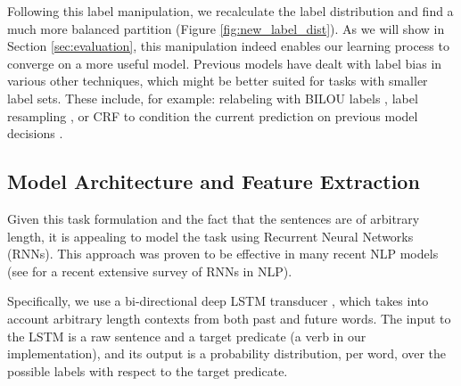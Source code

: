\begin{figure}[H]
\end{figure}


Following this label manipulation, we recalculate the label distribution and find
a much more balanced partition (Figure \ref{fig:new_label_dist}).
As we will show in Section \ref{sec:evaluation}, this manipulation indeed enables our learning process to
converge on a more useful model.
Previous models have dealt with label bias in various other techniques, which might be better suited
for tasks with smaller label sets. These include, for example:
relabeling with BILOU labels \cite{ratinov2009design},
label resampling \cite{estabrooks2004multiple},
or CRF to condition the current prediction on previous model decisions \cite{baidusrl}.

\subsection{Model Architecture and Feature Extraction}
Given this task formulation and the fact that the sentences are of arbitrary length,
it is appealing to model the task using Recurrent Neural Networks (RNNs).
This approach was proven to be effective in many recent NLP models 
(see \cite{goldberg2015primer} for a recent extensive survey of RNNs in NLP).

Specifically, we use a bi-directional deep LSTM transducer \cite{graves2012sequence},
which takes into account arbitrary length contexts from both past and future words.
The input to the LSTM is a raw sentence and a target predicate (a verb in our implementation),
and its output is a probability distribution, per word, over the possible labels with respect to the target predicate.

